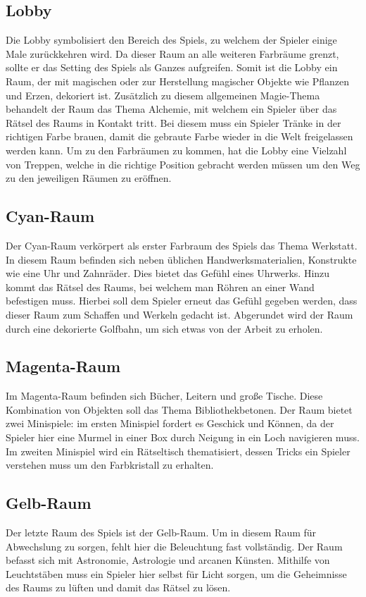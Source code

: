 \subsection{Lobby}
Die Lobby symbolisiert den Bereich des Spiels, zu welchem der Spieler einige Male zurückkehren wird. Da dieser Raum an alle weiteren Farbräume grenzt, sollte er das Setting des Spiels als Ganzes aufgreifen. Somit ist die Lobby ein Raum, der mit magischen oder zur Herstellung magischer Objekte wie Pflanzen und Erzen, dekoriert ist. Zusätzlich zu diesem allgemeinen Magie-Thema behandelt der Raum das Thema Alchemie, mit welchem ein Spieler über das Rätsel des Raums in Kontakt tritt. Bei diesem muss ein Spieler Tränke in der richtigen Farbe brauen, damit die gebraute Farbe wieder in die Welt freigelassen werden kann. Um zu den Farbräumen zu kommen, hat die Lobby eine Vielzahl von Treppen, welche in die richtige Position gebracht werden müssen um den Weg zu den jeweiligen Räumen zu eröffnen.

\subsection{Cyan-Raum}
Der Cyan-Raum verkörpert als erster Farbraum des Spiels das Thema \dq Werkstatt\dq. In diesem Raum befinden sich neben üblichen Handwerksmaterialien, Konstrukte wie eine Uhr und Zahnräder. Dies bietet das Gefühl eines Uhrwerks. Hinzu kommt das Rätsel des Raums, bei welchem man Röhren an einer Wand befestigen muss. Hierbei soll dem Spieler erneut das Gefühl gegeben werden, dass dieser Raum zum Schaffen und Werkeln gedacht ist. Abgerundet wird der Raum durch eine dekorierte Golfbahn, um sich etwas von der Arbeit zu erholen.

\subsection{Magenta-Raum}
Im Magenta-Raum befinden sich Bücher, Leitern und große Tische. Diese Kombination von Objekten soll das Thema \dq Bibliothek\dq betonen. Der Raum bietet zwei Minispiele: im ersten Minispiel fordert es Geschick und Können, da der Spieler hier eine Murmel in einer Box durch Neigung in ein Loch navigieren muss. Im zweiten Minispiel wird ein Rätseltisch thematisiert, dessen Tricks ein  Spieler verstehen muss um den Farbkristall zu erhalten.

\subsection{Gelb-Raum}
Der letzte Raum des Spiels ist der Gelb-Raum. Um in diesem Raum für Abwechslung zu sorgen, fehlt hier die Beleuchtung fast vollständig. Der Raum befasst sich mit Astronomie, Astrologie und arcanen Künsten. Mithilfe von Leuchtstäben muss ein Spieler hier selbst für Licht sorgen, um die Geheimnisse des Raums zu lüften und damit das Rätsel zu lösen.

